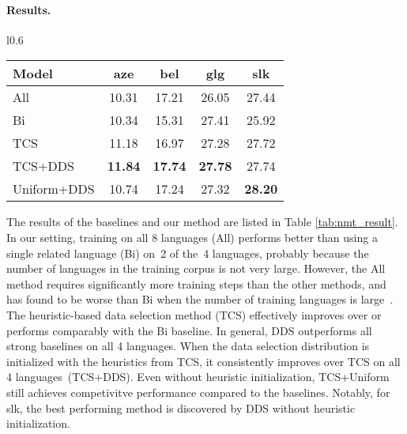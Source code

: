 \paragraph{Results.}
\begin{wraptable}{l}{0.6\textwidth}
\begin{center}
\vspace{-0.5cm}
    \begin{tabular}{l|cccc}
    \toprule
    \textbf{Model} & \textbf{aze} & \textbf{bel} & \textbf{glg} & \textbf{slk} \\
    \midrule
    All & 10.31 & 17.21 & 26.05 & 27.44 \\
    Bi & 10.34 & 15.31 & 27.41 & 25.92 \\
    TCS & 11.18 & 16.97 & 27.28 & 27.72 \\
    \midrule
    TCS+DDS & \textbf{11.84} & \textbf{17.74} & \textbf{27.78} & 27.74 \\
    Uniform+DDS & 10.74 & 17.24 & 27.32 & \textbf{28.20} \\
    \bottomrule
    \end{tabular}
\end{center}
\vspace{-0.5cm}
\end{wraptable}
The results of the baselines and our method are listed in Table \ref{tab:nmt_result}. In our setting, training on all 8 languages (All) performs better than using a single related language (Bi) on~2 of the~4 languages, probably because the number of languages in the training corpus is not very large. However, the All method requires significantly more training steps than the other methods, and has found to be worse than Bi when the number of training languages is large~\citep{rapid_adapt_nmt,TCS}. The heuristic-based data selection method (TCS) effectively improves over or performs comparably with the Bi baseline. In general, DDS outperforms all strong baselines on all 4 languages. When the data selection distribution is initialized with the heuristics from TCS, it consistently improves over TCS on all 4 languages~(TCS+DDS). Even without heuristic initialization, TCS+Uniform still achieves competivitve performance compared to the baselines. Notably, for slk, the best performing method is discovered by DDS without heuristic initialization.
